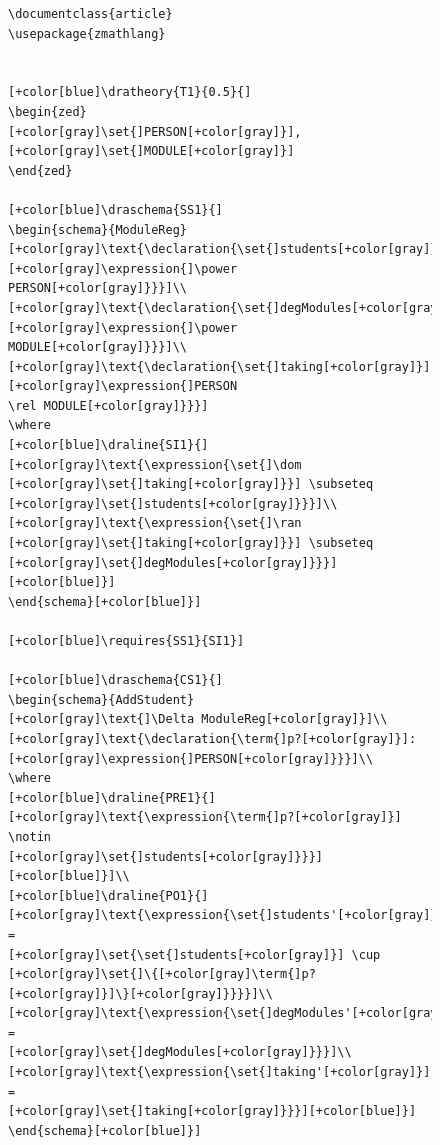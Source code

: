 \begin{figure}[H]
\vspace{-0.2in}
\centering
\begin{minipage}{0.45\textwidth}
\centering
\begin{tiny}
\begin{BVerbatim}[commandchars=+\[\]]
\documentclass{article}
\usepackage{zmathlang}


[+color[blue]\dratheory{T1}{0.5}{]
\begin{zed}
[+color[gray]\set{]PERSON[+color[gray]}],
[+color[gray]\set{]MODULE[+color[gray]}]
\end{zed}

[+color[blue]\draschema{SS1}{]
\begin{schema}{ModuleReg}
[+color[gray]\text{\declaration{\set{]students[+color[gray]}]:[+color[gray]\expression{]\power
PERSON[+color[gray]}}}]\\
[+color[gray]\text{\declaration{\set{]degModules[+color[gray]}]:[+color[gray]\expression{]\power
MODULE[+color[gray]}}}]\\
[+color[gray]\text{\declaration{\set{]taking[+color[gray]}]:[+color[gray]\expression{]PERSON
\rel MODULE[+color[gray]}}}]
\where
[+color[blue]\draline{SI1}{] [+color[gray]\text{\expression{\set{]\dom
[+color[gray]\set{]taking[+color[gray]}}] \subseteq
[+color[gray]\set{]students[+color[gray]}}}]\\
[+color[gray]\text{\expression{\set{]\ran
[+color[gray]\set{]taking[+color[gray]}}] \subseteq
[+color[gray]\set{]degModules[+color[gray]}}}][+color[blue]}]
\end{schema}[+color[blue]}]

[+color[blue]\requires{SS1}{SI1}]

[+color[blue]\draschema{CS1}{]
\begin{schema}{AddStudent}
[+color[gray]\text{]\Delta ModuleReg[+color[gray]}]\\
[+color[gray]\text{\declaration{\term{]p?[+color[gray]}]:[+color[gray]\expression{]PERSON[+color[gray]}}}]\\
\where
[+color[blue]\draline{PRE1}{]
[+color[gray]\text{\expression{\term{]p?[+color[gray]}] \notin
[+color[gray]\set{]students[+color[gray]}}}][+color[blue]}]\\
[+color[blue]\draline{PO1}{]
[+color[gray]\text{\expression{\set{]students'[+color[gray]}] =
[+color[gray]\set{\set{]students[+color[gray]}] \cup
[+color[gray]\set{]\{[+color[gray]\term{]p?[+color[gray]}]\}[+color[gray]}}}}]\\
[+color[gray]\text{\expression{\set{]degModules'[+color[gray]}] =
[+color[gray]\set{]degModules[+color[gray]}}}]\\
[+color[gray]\text{\expression{\set{]taking'[+color[gray]}] =
[+color[gray]\set{]taking[+color[gray]}}}][+color[blue]}]
\end{schema}[+color[blue]}]


\end{BVerbatim}
\end{tiny}
\end{minipage}
\end{figure}
